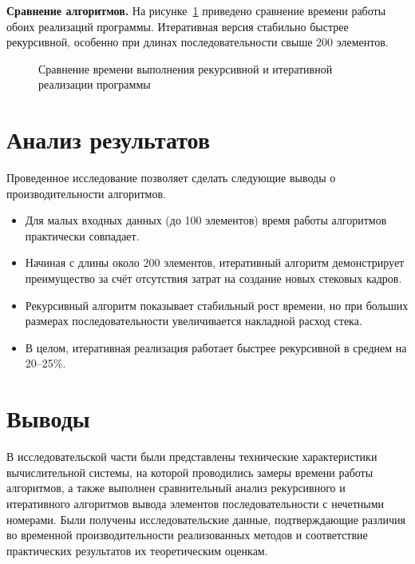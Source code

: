 \textbf{Сравнение алгоритмов.}  
На рисунке~\ref{pic_comparison} приведено сравнение времени работы обоих реализаций программы.  
Итеративная версия стабильно быстрее рекурсивной, особенно при длинах последовательности свыше 200 элементов.

\begin{figure}[H]
	\caption{Сравнение времени выполнения рекурсивной и итеративной реализации программы}
	\label{pic_comparison}
\end{figure}

\section{Анализ результатов}

Проведенное исследование позволяет сделать следующие выводы о производительности алгоритмов.
\begin{itemize}
	\item Для малых входных данных (до 100 элементов) время работы алгоритмов практически совпадает.
	\item Начиная с длины около 200 элементов, итеративный алгоритм демонстрирует преимущество за счёт отсутствия затрат на создание новых стековых кадров.
	\item Рекурсивный алгоритм показывает стабильный рост времени, но при больших размерах последовательности увеличивается накладной расход стека.
	\item В целом, итеративная реализация работает быстрее рекурсивной в среднем на 20–25\%.
\end{itemize}

\section*{Выводы}

В исследовательской части были представлены технические характеристики вычислительной системы, на которой проводились замеры времени работы алгоритмов, а также выполнен сравнительный анализ рекурсивного и итеративного алгоритмов вывода элементов последовательности с нечетными номерами. Были получены исследовательские данные, подтверждающие различия во временной производительности реализованных методов и соответствие практических результатов их теоретическим оценкам.



